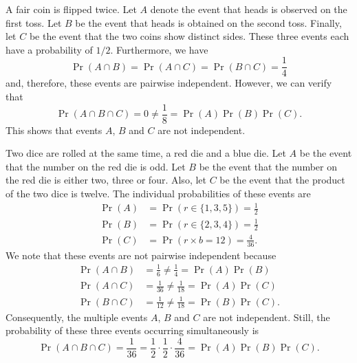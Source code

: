 \begin{example}
A fair coin is flipped twice.
Let $A$ denote the event that heads is observed on the first toss.
Let $B$ be the event that heads is obtained on the second toss.
Finally, let $C$ be the event that the two coins show distinct sides.
These three events each have a probability of $1/2$.
Furthermore, we have
\begin{equation*}
\Pr (A \cap B) = \Pr (A \cap C) = \Pr (B \cap C) = \frac{1}{4}
\end{equation*}
and, therefore, these events are pairwise independent.
However, we can verify that
\begin{equation*}
\Pr (A \cap B \cap C) = 0 \neq \frac{1}{8} = \Pr (A) \Pr (B) \Pr (C) .
\end{equation*}
This shows that events $A$, $B$ and $C$ are not independent.
\end{example}

\begin{example}
Two dice are rolled at the same time, a red die and a blue die.
Let $A$ be the event that the number on the red die is odd.
Let $B$ be the event that the number on the red die is either two, three or four.
Also, let $C$ be the event that the product of the two dice is twelve.
The individual probabilities of these events are
\begin{align*}
\Pr (A) &= \Pr (r \in \{1, 3, 5\}) = \frac{1}{2} \\
\Pr (B) &= \Pr (r \in \{2, 3, 4\}) = \frac{1}{2} \\
\Pr (C) &= \Pr (r \times b = 12) = \frac{4}{36} .
\end{align*}
We note that these events are not pairwise independent because
\begin{align*}
\Pr (A \cap B) &= \frac{1}{6} \neq \frac{1}{4} = \Pr(A) \Pr(B) \\
\Pr (A \cap C) &= \frac{1}{36} \neq \frac{1}{18} = \Pr(A) \Pr(C) \\
\Pr (B \cap C) &= \frac{1}{12} \neq \frac{1}{18} = \Pr(B) \Pr(C) .
\end{align*}
Consequently, the multiple events $A$, $B$ and $C$ are not independent.
Still, the probability of these three events occurring simultaneously is
\begin{equation*}
\Pr (A \cap B \cap C) = \frac{1}{36}
= \frac{1}{2} \cdot \frac{1}{2} \cdot \frac{4}{36}
= \Pr (A) \Pr (B) \Pr (C) .
\end{equation*}
\end{example}

